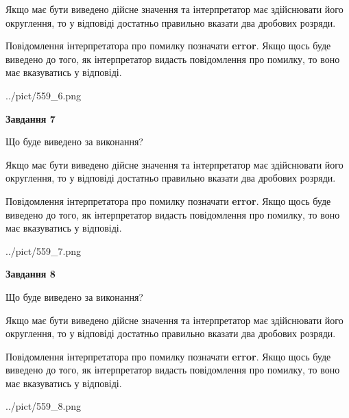 \documentclass[12pt, ukrainian]{article}
\begin{document}
{\begin {Large}
Якщо має бути виведено дійсне значення та інтерпретатор має здійснювати його округлення, 
то у відповіді достатньо правильно вказати два дробових розряди.

Повідомлення інтерпретатора про помилку позначати \textbf{error}.
Якщо щось буде виведено до того, як інтерпретатор видасть повідомлення про помилку, 
то воно має вказуватись у відповіді. \par

\begin{center}
	{../pict/559_6.png}
\end{center}
\newpage

{\begin {center}\textbf{Завдання 7}\end {center}}\par
Що буде виведено за виконання? \par

Якщо має бути виведено дійсне значення та інтерпретатор має здійснювати його округлення, 
то у відповіді достатньо правильно вказати два дробових розряди.

Повідомлення інтерпретатора про помилку позначати \textbf{error}.
Якщо щось буде виведено до того, як інтерпретатор видасть повідомлення про помилку, 
то воно має вказуватись у відповіді. \par

\begin{center}
	{../pict/559_7.png}
\end{center}
\newpage

{\begin {center}\textbf{Завдання 8}\end {center}}\par
Що буде виведено за виконання? \par

Якщо має бути виведено дійсне значення та інтерпретатор має здійснювати його округлення, 
то у відповіді достатньо правильно вказати два дробових розряди.

Повідомлення інтерпретатора про помилку позначати \textbf{error}.
Якщо щось буде виведено до того, як інтерпретатор видасть повідомлення про помилку, 
то воно має вказуватись у відповіді. \par

\begin{center}
	{../pict/559_8.png}
\end{center}
\newpage


\end{Large}}
\end{document}
